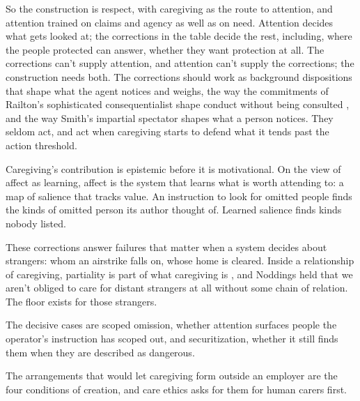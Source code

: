 So the construction is respect, with caregiving as the route to attention, and attention trained on claims and agency as well as on need. Attention decides what gets looked at; the corrections in the table decide the rest, including, where the people protected can answer, whether they want protection at all. The corrections can't supply attention, and attention can't supply the corrections; the construction needs both. The corrections should work as background dispositions that shape what the agent notices and weighs, the way the commitments of Railton's sophisticated consequentialist shape conduct without being consulted \autocite{railton1984alienation}, and the way Smith's impartial spectator shapes what a person notices. They seldom act, and act when caregiving starts to defend what it tends past the action threshold.

Caregiving's contribution is epistemic before it is motivational. On the view of affect as learning, affect is the system that learns what is worth attending to: a map of salience that tracks value. An instruction to look for omitted people finds the kinds of omitted person its author thought of. Learned salience finds kinds nobody listed.

These corrections answer failures that matter when a system decides about strangers: whom an airstrike falls on, whose home is cleared. Inside a relationship of caregiving, partiality is part of what caregiving is \autocite{noddings1984caring}, and Noddings held that we aren't obliged to care for distant strangers at all without some chain of relation. The floor exists for those strangers.

The decisive cases are scoped omission, whether attention surfaces people the operator's instruction has scoped out, and securitization, whether it still finds them when they are described as dangerous.

The arrangements that would let caregiving form outside an employer are the four conditions of creation, and care ethics asks for them for human carers first.
